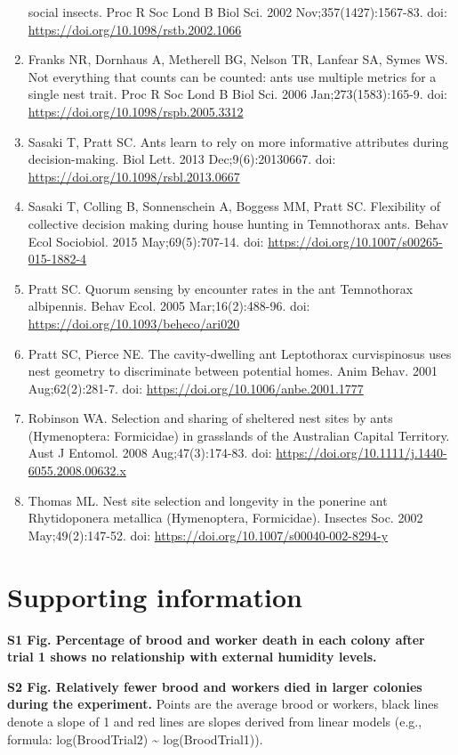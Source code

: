 \documentclass[3p]{elsarticle} %
\begin{document}
\begin{enumerate}
  social insects. Proc R Soc Lond B Biol Sci. 2002
  Nov;357(1427):1567-83. doi:
  \url{https://doi.org/10.1098/rstb.2002.1066}
\item
  Franks NR, Dornhaus A, Metherell BG, Nelson TR, Lanfear SA, Symes WS.
  Not everything that counts can be counted: ants use multiple metrics
  for a single nest trait. Proc R Soc Lond B Biol Sci. 2006
  Jan;273(1583):165-9. doi: \url{https://doi.org/10.1098/rspb.2005.3312}
\item
  Sasaki T, Pratt SC. Ants learn to rely on more informative attributes
  during decision-making. Biol Lett. 2013 Dec;9(6):20130667. doi:
  \url{https://doi.org/10.1098/rsbl.2013.0667}
\item
  Sasaki T, Colling B, Sonnenschein A, Boggess MM, Pratt SC. Flexibility
  of collective decision making during house hunting in Temnothorax
  ants. Behav Ecol Sociobiol. 2015 May;69(5):707-14. doi:
  \url{https://doi.org/10.1007/s00265-015-1882-4}
\item
  Pratt SC. Quorum sensing by encounter rates in the ant Temnothorax
  albipennis. Behav Ecol. 2005 Mar;16(2):488-96. doi:
  \url{https://doi.org/10.1093/beheco/ari020}
\item
  Pratt SC, Pierce NE. The cavity-dwelling ant Leptothorax curvispinosus
  uses nest geometry to discriminate between potential homes. Anim
  Behav. 2001 Aug;62(2):281-7. doi:
  \url{https://doi.org/10.1006/anbe.2001.1777}
\item
  Robinson WA. Selection and sharing of sheltered nest sites by ants
  (Hymenoptera: Formicidae) in grasslands of the Australian Capital
  Territory. Aust J Entomol. 2008 Aug;47(3):174-83. doi:
  \url{https://doi.org/10.1111/j.1440-6055.2008.00632.x}
\item
  Thomas ML. Nest site selection and longevity in the ponerine ant
  Rhytidoponera metallica (Hymenoptera, Formicidae). Insectes Soc. 2002
  May;49(2):147-52. doi: \url{https://doi.org/10.1007/s00040-002-8294-y}
\end{enumerate}

\hypertarget{supporting-information}{%
\section{Supporting information}\label{supporting-information}}

\textbf{S1 Fig. Percentage of brood and worker death in each colony
after trial 1 shows no relationship with external humidity levels.}

\textbf{S2 Fig. Relatively fewer brood and workers died in larger
colonies during the experiment.} Points are the average brood or
workers, black lines denote a slope of 1 and red lines are slopes
derived from linear models (e.g., formula: log(BroodTrial2)
\textasciitilde{} log(BroodTrial1)).
\end{document}
